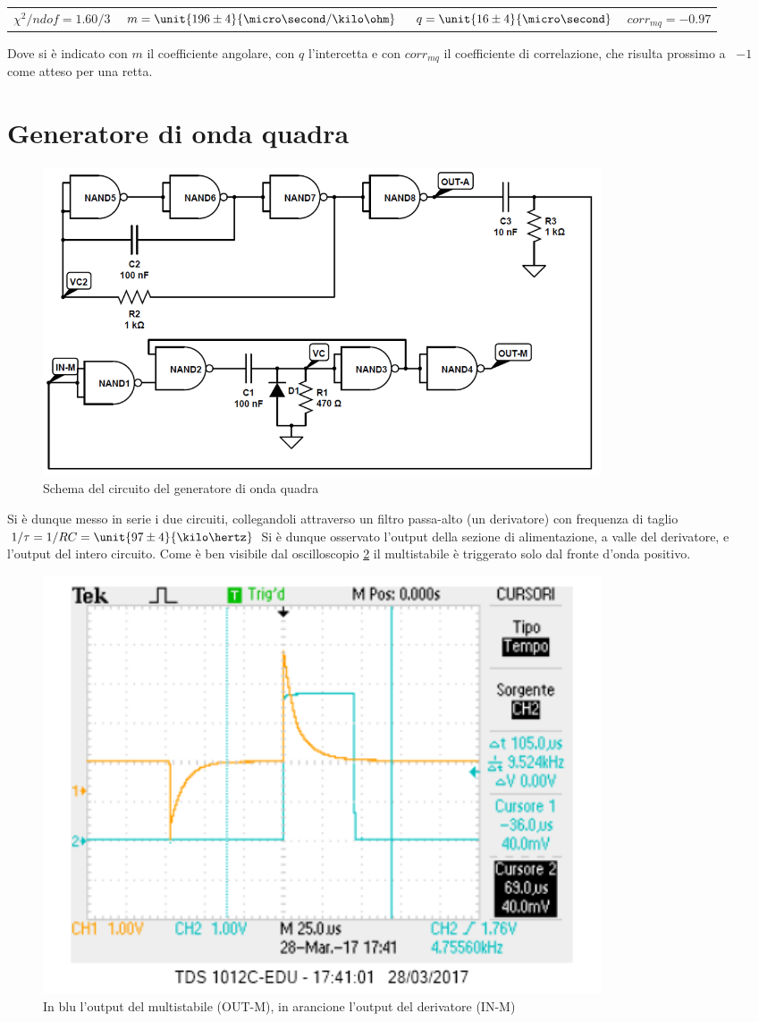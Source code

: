 \documentclass[a4paper,10pt]{article}
\begin{document}
\begin{table}[H]
	\centering
	\begin{tabular}{cccc}
		$\chi^2/ndof = 1.60/3$ & $m = \unit{196 \pm 4}{\micro\second / \kilo\ohm}$ & $q = \unit{16 \pm 4}{\micro\second}$ & $corr_{mq} = -0.97$\\
	\end{tabular}
\end{table}

Dove si è indicato con $m$ il coefficiente angolare, con $q$ l'intercetta e con $corr_{mq}$ il coefficiente di correlazione, che risulta prossimo a ~$-1$ come atteso per una retta.

\section{Generatore di onda quadra}

\begin{figure}[H]
	\centering
	\includegraphics[width=0.8\textwidth]{../grafici/SqGen.png}
	\caption{Schema del circuito del generatore di onda quadra}
	\label{fig:SQGEN}
\end{figure}

Si è dunque messo in serie i due circuiti, collegandoli attraverso un filtro passa-alto (un derivatore) con frequenza di taglio $1/\tau=1/RC=\unit{97 \pm 4}{\kilo\hertz}$
Si è dunque osservato l'output della sezione di alimentazione, a valle del derivatore, e l'output del intero circuito. Come è ben visibile dal oscilloscopio \cref{fig:InMOutM} il multistabile è triggerato solo dal fronte d'onda positivo. 

\begin{figure}[H]
	\centering
	\includegraphics[width=0.8\textwidth]{../grafici/4InMOutM.png}
	\caption{In blu l'output del multistabile (OUT-M), in arancione l'output del derivatore (IN-M)}
	\label{fig:InMOutM}
\end{figure}
\end{document}
